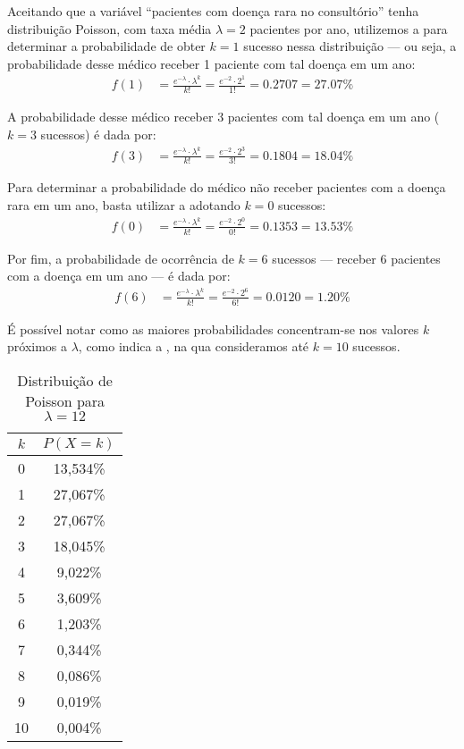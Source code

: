 \begin{sol}
Aceitando que a variável ``pacientes com doença rara no consultório'' tenha
distribuição Poisson, com taxa média $\lambda=2$ pacientes por ano, utilizemos
a  para determinar a probabilidade de obter $k=1$
sucesso nessa distribuição --- ou seja, a probabilidade desse médico receber 1
paciente com tal doença em um ano:
\begin{align*}
    f(1) &= \frac{e^{-\lambda} \cdot \lambda^{k}}{k!}
          = \frac{e^{-2} \cdot 2^{1}}{1!}
          = 0.2707 = 27.07 \%
\end{align*}

A probabilidade desse médico receber 3 pacientes com tal doença em um ano
($k=3$ sucessos) é dada por:
\begin{align*}
    f(3) &= \frac{e^{-\lambda} \cdot \lambda^{k}}{k!}
          = \frac{e^{-2} \cdot 2^{3}}{3!}
          = 0.1804 = 18.04 \%
\end{align*}

Para determinar a probabilidade do médico não receber pacientes com a doença
rara em um ano, basta utilizar a  adotando $k=0$
sucessos:
\begin{align*}
    f(0) &= \frac{e^{-\lambda} \cdot \lambda^{k}}{k!}
          = \frac{e^{-2} \cdot 2^{0}}{0!}
          = 0.1353 = 13.53 \%
\end{align*}

Por fim, a probabilidade de ocorrência de $k=6$ sucessos --- receber 6
pacientes com a doença em um ano --- é dada por:
\begin{align*}
    f(6) &= \frac{e^{-\lambda} \cdot \lambda^{k}}{k!}
          = \frac{e^{-2} \cdot 2^{6}}{6!}
          = 0.0120 = 1.20 \%
\end{align*}

É possível notar como as maiores probabilidades concentram-se nos valores
$k$ próximos a $\lambda$, como indica a , na qua
consideramos até $k=10$ sucessos.

\begin{table}[htpb]
    \centering
    \begin{tabular}{cc}
        \toprule
        $k$ & $P(X=k)$ \\
        \midrule
        0   & 13,534\% \\
        1   & 27,067\% \\
        2   & 27,067\% \\
        3   & 18,045\% \\
        4   & 9,022\%  \\
        5   & 3,609\%  \\
        6   & 1,203\%  \\
        7   & 0,344\%  \\
        8   & 0,086\%  \\
        9   & 0,019\%  \\
        10  & 0,004\%  \\
        \bottomrule
    \end{tabular}
    \caption{Distribuição de Poisson para $\lambda=12$}
    \label{tab:dist-poisson-l12}
\end{table}

\end{sol}
